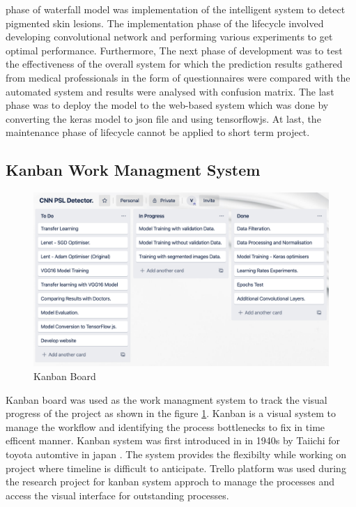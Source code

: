 phase of waterfall model was implementation of the intelligent system to detect pigmented skin
lesions. The implementation phase of the lifecycle involved developing convolutional network and
performing various experiments to get optimal performance. Furthermore, The next phase of
development was to test the effectiveness of the overall system for which the prediction results
gathered from medical professionals in the form of questionnaires were compared with the
automated system and results were analysed with confusion matrix. The last phase was to deploy
the model to the web-based system which was done by converting the keras model to json file and
using tensorflowjs. At last, the maintenance phase of lifecycle cannot be applied to short term
project.

\pagebreak
\subsection{Kanban Work Managment System}
\begin{figure}[!htp]
    \centering
    \includegraphics[width=15cm]{Images/Kanban Bords.png}
    \caption{Kanban Board}
    \label{fig:kanban}
\end{figure}
Kanban board was used as the work managment system to track the visual progress 
of the project as shown in the figure \ref{fig:kanban}. Kanban is a visual system 
to manage the workflow and identifying the process bottlenecks to fix in time efficent manner\citep{kban}. 
Kanban system was first introduced in in 1940s by Taiichi for toyota automtive in japan \citep{kban}.
The system provides the flexibilty while working on project where timeline is difficult to 
anticipate. Trello platform was used during the research project for kanban system approch to manage 
the processes and access the visual interface for outstanding processes.
